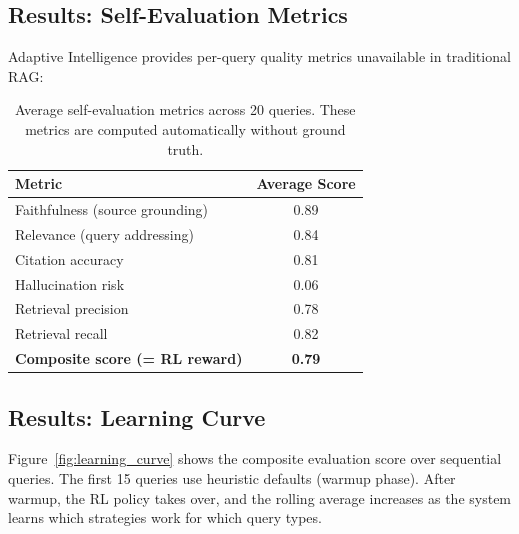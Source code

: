 \documentclass[11pt]{article}
\begin{document}
\subsection{Results: Self-Evaluation Metrics}

Adaptive Intelligence provides per-query quality metrics unavailable in traditional RAG:

\begin{table}[H]
    \centering
    \begin{tabular}{@{}lc@{}}
        \toprule
        \textbf{Metric} & \textbf{Average Score} \\
        \midrule
        Faithfulness (source grounding)    & 0.89 \\
        Relevance (query addressing)       & 0.84 \\
        Citation accuracy                  & 0.81 \\
        Hallucination risk                 & 0.06 \\
        Retrieval precision                & 0.78 \\
        Retrieval recall                   & 0.82 \\
        \midrule
        \textbf{Composite score (= RL reward)} & \textbf{0.79} \\
        \bottomrule
    \end{tabular}
    \caption{Average self-evaluation metrics across 20 queries. These metrics are computed automatically without ground truth.}
    \label{tab:eval_metrics}
\end{table}

\subsection{Results: Learning Curve}

Figure~\ref{fig:learning_curve} shows the composite evaluation score over sequential queries. The first 15 queries use heuristic defaults (warmup phase). After warmup, the RL policy takes over, and the rolling average increases as the system learns which strategies work for which query types.
\end{document}
